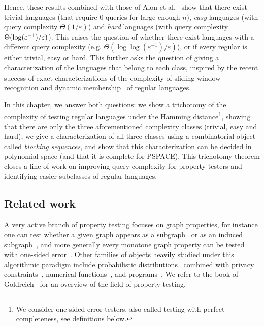 \documentclass[letterpaper, USenglish, cleveref, autoref, thm-restate, numberwithinsect]{lipics-v2021}
\theoremstyle{theorem}
\theoremstyle{definition}
\newcommand{\eps}{\varepsilon}
\newcommand{\PSPACE}{\textsf{PSPACE}\xspace}
\newcommand{\epslogeps}[1][]
{\ifthenelse{\equal{#1}{}}{\log(\eps^{-1})/\eps}{\log^{ #1 }(\eps^{-1})/\eps}}
\newcommand{\doc}{chapter\xspace}
\newcommand{\doc}{article\xspace}
\begin{document}
Hence, these results combined with those of Alon et al.~\cite{alon2001regular} show that there exist trivial languages (that require 0 queries for large enough $n$), \emph{easy} languages (with query complexity $\Theta(1/\eps)$) and \emph{hard} languages (with query complexity $\Theta(\epslogeps)$).
This raises the question of whether there exist languages with a different query complexity (e.g. $\Theta(\log\log(\eps^{-1})/\eps)$), or if every regular is either trivial, easy or hard.
This further asks the question of giving a characterization of the languages that belong to each class, inspired by the recent success of exact characterizations of the complexity of sliding window~\cite{GanardiHL18} recognition and dynamic membership~\cite{amarilli2021dynamic} of regular languages.

In this \doc, we answer both questions: we show a trichotomy of the complexity of testing regular languages under the Hamming distance\footnote{We consider one-sided error testers, also called testing with perfect completeness, see definitions below.}, showing that there are only the three aforementioned complexity classes (trivial, easy and hard), we give a characterization of all three classes using a combinatorial object called \emph{blocking sequences}, and show that this characterization can be decided in polynomial space (and that it is complete for \PSPACE).
This trichotomy theorem closes a line of work on improving query complexity for property testers and identifying easier subclasses of regular languages. 



\subsection{Related work}

A very active branch of property testing focuses on graph properties, for instance one can test whether a given graph appears as a subgraph~\cite{AlonDLRY94} or as an induced subgraph~\cite{alon2000efficient}, and more generally every monotone graph property can be tested with one-sided error~\cite{AlonS08a}. Other families of objects heavily studied under this algorithmic paradigm include probabilistic distributions~\cite{paninski2008coincidence,diakonikolas2016new} combined with privacy constraints~\cite{Aliakbarpour2018DifferentiallyPI},
numerical functions~\cite{blum1990self, rubinfeld1996robust}, and programs~\cite{ergun1998spot,dodis1999improved}.
We refer to the book of Goldreich~\cite{goldreich2017introduction} for an overview of the field of property testing.
\end{document}
